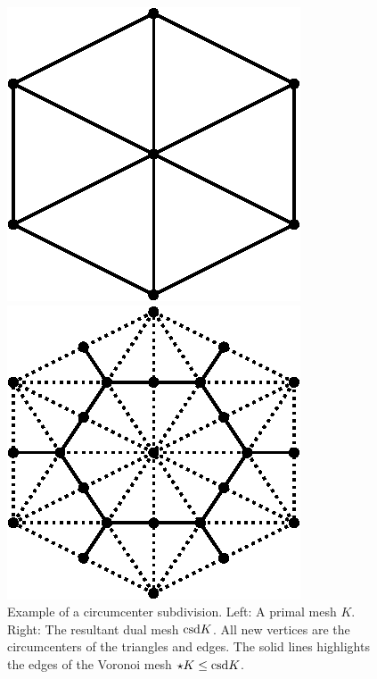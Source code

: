     \begin{figure}
      \begin{minipage}[htp]{.24\textwidth}
        \centering
        \includegraphics[width=.9\textwidth]{bilder/tikz/K.eps}
      \end{minipage}\hfill
      \begin{minipage}[htp]{.24\textwidth}
        \centering
        \includegraphics[width=.9\textwidth]{bilder/tikz/CsdK.eps}
      \end{minipage}
      \caption{Example of a circumcenter subdivision.
               Left: A primal mesh \( K \).
               Right: The resultant dual mesh \( \text{csd} K \). 
               All new vertices are the circumcenters of the triangles and edges.
               The solid lines highlights the edges of the Voronoi mesh \( \star K \leq \text{csd} K \).}
      \label{figExSubdivision}
    \end{figure}

